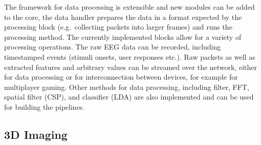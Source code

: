 \documentclass[10pt]{article}
\begin{document}
The framework for data processing is extensible and new modules can be added to the core, the data handler prepares the data in a format expected by the processing block (e.g.~collecting packets into larger frames) and runs the processing method. The currently implemented blocks allow for a variety of processing operations. The raw EEG data can be recorded, including timestamped events (stimuli onsets, user responses etc.). Raw packets as well as extracted features and arbitrary values can be streamed over the network, either for data processing or for interconnection between devices, for example for multiplayer gaming. Other methods for data processing, including filter, FFT, spatial filter (CSP), and classifier (LDA) are also implemented and can be used for building the pipelines.

	\subsection{3D Imaging}
\end{document}
